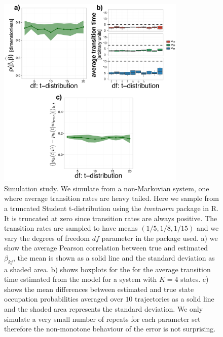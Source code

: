 \begin{figure}
  \centering \includegraphics[width=0.8\textwidth]{pics/student-t.pdf}
  \caption{Simulation study. We simulate from a non-Markovian system, one where average transition rates are heavy tailed. Here we sample from a truncated Student t-distribution using the \emph{tmvtnorm} package in R. It is truncated at zero since transition rates are always positive. The transition rates are sampled to have means $(1/5, 1/8, 1/15)$ and we vary the degrees of freedom $df$ parameter in the package used. a) we show the average Pearson correlation between true and estimated $\beta_{kj}$, the mean is shown as a solid line and the standard deviation as a shaded area. b) shows boxplots for the for the average transition time estimated from the model for a system with $K=4$ states. c) shows the mean differences between estimated and true state occupation probabilities averaged over $10$ trajectories as a solid line and the shaded area represents the standard deviation. We only simulate a very small number of repeats for each parameter set therefore the non-monotone behaviour of the error is not surprising.}
\label{fig:student}
\end{figure}


